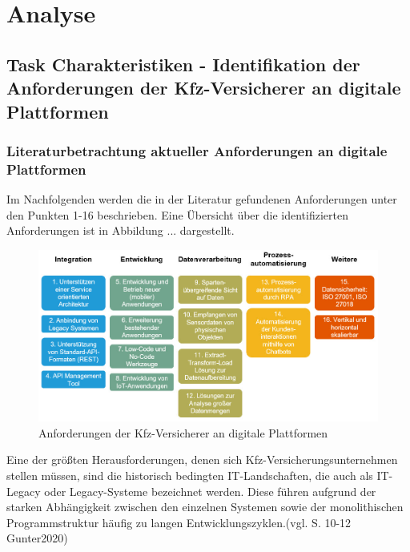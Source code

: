 \chapter{Analyse}
\section{Task Charakteristiken - Identifikation der Anforderungen der Kfz-Versicherer an digitale Plattformen}

\subsection{Literaturbetrachtung aktueller Anforderungen an digitale Plattformen}

Im Nachfolgenden werden die in der Literatur gefundenen Anforderungen unter den Punkten 1-16 beschrieben. Eine Übersicht über die identifizierten Anforderungen ist in Abbildung ... dargestellt.

\begin{figure}[h]
    \centering
    \includegraphics[width=1\textwidth]{img/PP_Anforderungen.jpg}
    \caption[Anforderungen der Kfz-Versicherer an digitale Plattformen]{Anforderungen der Kfz-Versicherer an digitale Plattformen\autocite{PPAnf}}
    \label{fig:PPAnf}
\end{figure}

Eine der größten Herausforderungen, denen sich Kfz-Versicherungsunternehmen stellen müssen, sind die historisch bedingten IT-Landschaften, die auch als IT-Legacy oder Legacy-Systeme bezeichnet werden. Diese führen aufgrund der starken Abhängigkeit zwischen den einzelnen Systemen sowie der monolithischen Programmstruktur häufig zu langen Entwicklungszyklen.(vgl. S. 10-12 Gunter2020) 

